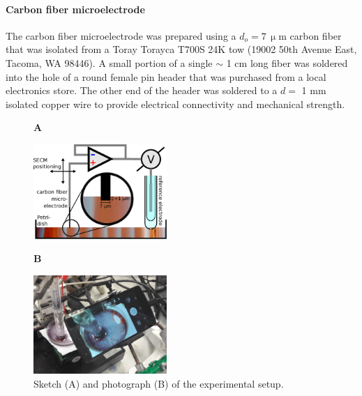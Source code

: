 \documentclass[3p, twocolumn]{elsarticle}
\begin{document}
\paragraph{Carbon fiber microelectrode} The carbon fiber microelectrode was prepared using a $d_o=7\, \upmu$m carbon fiber that was isolated from a Toray Torayca T700S 24K tow (19002 50th Avenue East, Tacoma, WA 98446).
A small portion of a single $\sim$ 1 cm long fiber was soldered into the hole of a round female pin header that was purchased from a local electronics store. 
The other end of the header was soldered to a $d=$ 1 mm isolated copper wire to provide electrical connectivity and mechanical strength. 

\begin{figure}
\centering
\begin{flushleft}
\textbf{A}
\end{flushleft}

\includegraphics[width=0.45\textwidth]{setup.eps}

\begin{flushleft}
\textbf{B}
\end{flushleft}

\includegraphics[width=0.45\textwidth]{setup_photo.jpg}

\caption{
Sketch (A) and photograph (B) of the experimental setup.
}
\label{fig:setup}
\end{figure}
\end{document}
